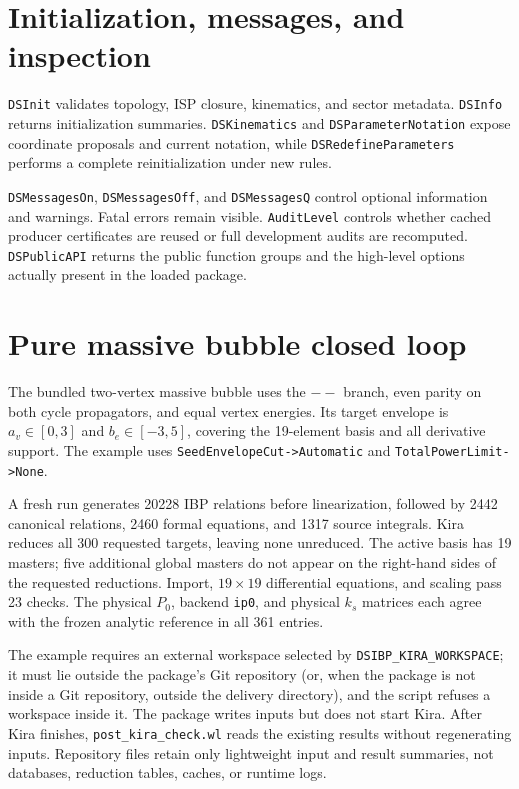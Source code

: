﻿\documentclass[a4paper,11pt]{article}
\begin{document}
\section{Initialization, messages, and inspection}

\texttt{DSInit} validates topology, ISP closure, kinematics, and sector metadata.
\texttt{DSInfo} returns initialization summaries. \texttt{DSKinematics} and
\texttt{DSParameterNotation} expose coordinate proposals and current notation, while
\texttt{DSRedefineParameters} performs a complete reinitialization under new rules.

\texttt{DSMessagesOn}, \texttt{DSMessagesOff}, and \texttt{DSMessagesQ} control optional
information and warnings. Fatal errors remain visible. \texttt{AuditLevel} controls whether
cached producer certificates are reused or full development audits are recomputed.
\texttt{DSPublicAPI} returns the public function groups and the high-level options actually
present in the loaded package.

\section{Pure massive bubble closed loop}

The bundled two-vertex massive bubble uses the $--$ branch, even parity on both cycle
propagators, and equal vertex energies. Its target envelope is $a_v\in[0,3]$ and
$b_e\in[-3,5]$, covering the 19-element basis and all derivative support. The example uses
\texttt{SeedEnvelopeCut->Automatic} and \texttt{TotalPowerLimit->None}.

A fresh run generates 20228 IBP relations before linearization, followed by 2442 canonical
relations, 2460 formal equations, and 1317 source integrals. Kira reduces all 300 requested
targets, leaving none unreduced. The active basis has 19 masters; five additional global
masters do not appear on the right-hand sides of the requested reductions. Import,
$19\times19$ differential equations, and scaling pass 23 checks. The physical $P_0$,
backend \texttt{ip0}, and physical $k_s$ matrices each agree with the frozen analytic
reference in all 361 entries.

The example requires an external workspace selected by \texttt{DSIBP\_KIRA\_WORKSPACE}; it must lie outside the package's Git repository (or, when the package is not inside a Git repository, outside the delivery directory), and the script refuses a workspace inside it.
The package writes inputs but does not start Kira. After Kira finishes,
\texttt{post\_kira\_check.wl} reads the existing results without regenerating inputs.
Repository files retain only lightweight input and result summaries, not databases,
reduction tables, caches, or runtime logs.
\end{document}
